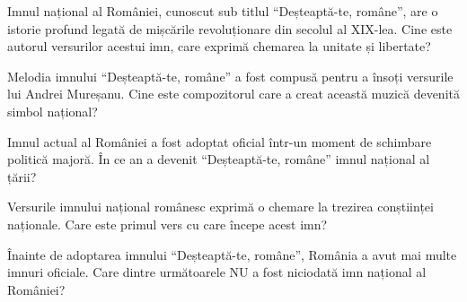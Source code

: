 \startSection
	
	\begin{question}{Imnul național al României, cunoscut sub titlul \enquote{Deșteaptă-te, române}, are o istorie profund legată de mișcările revoluționare din secolul al XIX-lea. Cine este autorul versurilor acestui imn, care exprimă chemarea la unitate și libertate?}
	\end{question}

	
	\begin{question}{Melodia imnului \enquote{Deșteaptă-te, române} a fost compusă pentru a însoți versurile lui Andrei Mureșanu. Cine este compozitorul care a creat această muzică devenită simbol național?}
	\end{question}

	
	\begin{question}{Imnul actual al României a fost adoptat oficial într-un moment de schimbare politică majoră. În ce an a devenit \enquote{Deșteaptă-te, române} imnul național al țării?}
	\end{question}

	
	\begin{question}{Versurile imnului național românesc exprimă o chemare la trezirea conștiinței naționale. Care este primul vers cu care începe acest imn?}
	\end{question}

	
	\begin{question}{Înainte de adoptarea imnului \enquote{Deșteaptă-te, române}, România a avut mai multe imnuri oficiale. Care dintre următoarele NU a fost niciodată imn național al României?}
	\end{question}
\renderSection
